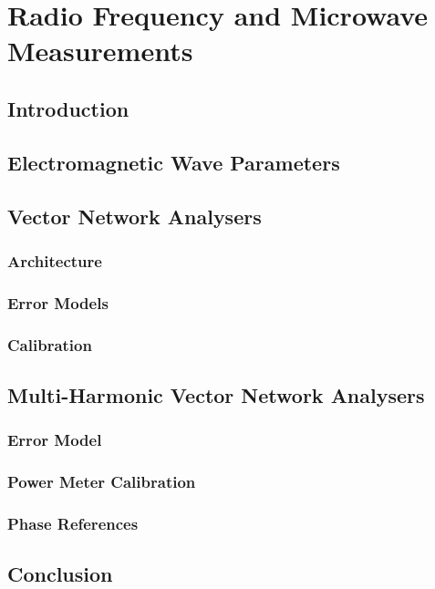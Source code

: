 \documentclass[../thesis/thesis.tex]{subfiles}
\begin{document}
\chapter{Radio Frequency and Microwave Measurements}
\section{Introduction}
\section{Electromagnetic Wave Parameters}
\section{Vector Network Analysers}
\subsection{Architecture}
\subsection{Error Models}
\subsection{Calibration}
\section{Multi-Harmonic Vector Network Analysers}
\subsection{Error Model}
\subsection{Power Meter Calibration}
\subsection{Phase References}
\section{Conclusion}
\end{document}
